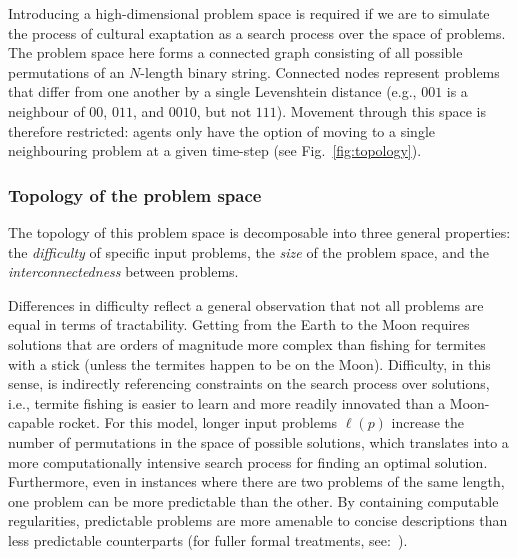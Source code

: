 \documentclass{article}
\begin{document}
Introducing a high-dimensional problem space is required if we are to simulate the process of cultural exaptation as a search process over the space of problems. The problem space here forms a connected graph consisting of all possible permutations of an $N$-length binary string. Connected nodes represent problems that differ from one another by a single Levenshtein distance (e.g., $001$ is a neighbour of $00$, $011$, and $0010$, but not $111$). Movement through this space is therefore restricted: agents only have the option of moving to a single neighbouring problem at a given time-step (see Fig.~\ref{fig:topology}).

\subsubsection{Topology of the problem space}
The topology of this problem space is decomposable into three general properties: the {\em difficulty} of specific input problems, the {\em size} of the problem space, and the {\em interconnectedness} between problems.

Differences in difficulty reflect a general observation that not all problems are equal in terms of tractability. Getting from the Earth to the Moon requires solutions that are orders of magnitude more complex than fishing for termites with a stick (unless the termites happen to be on the Moon). Difficulty, in this sense, is indirectly referencing constraints on the search process over solutions, i.e., termite fishing is easier to learn and more readily innovated than a Moon-capable rocket. For this model, longer input problems $\ell(p)$ increase the number of permutations in the space of possible solutions, which translates into a more computationally intensive search process for finding an optimal solution. Furthermore, even in instances where there are two problems of the same length, one problem can be more predictable than the other. By containing computable regularities, predictable problems are more amenable to concise descriptions than less predictable counterparts (for fuller formal treatments, see:~\cite{cover2012elements,li_introduction_2008}).

\end{document}
